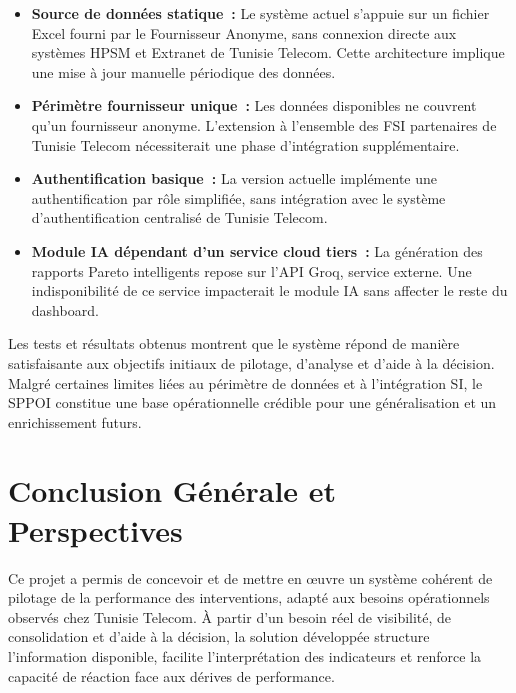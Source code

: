 \documentclass[10pt,a4paper]{report}
\newcommand{\chapconclusion}[1]{%
  \vspace{8pt}%
  \begin{tcolorbox}[conclusionbox]
    #1
  \end{tcolorbox}%
}
\begin{document}
\begin{itemize}[leftmargin=*, itemsep=6pt]
  \item \textbf{Source de données statique~:} Le système actuel s'appuie sur un fichier Excel fourni par le Fournisseur Anonyme, sans connexion directe aux systèmes HPSM et Extranet de Tunisie Telecom. Cette architecture implique une mise à jour manuelle périodique des données.

  \item \textbf{Périmètre fournisseur unique~:} Les données disponibles ne couvrent qu'un fournisseur anonyme. L'extension à l'ensemble des FSI partenaires de Tunisie Telecom nécessiterait une phase d'intégration supplémentaire.

  \item \textbf{Authentification basique~:} La version actuelle implémente une authentification par rôle simplifiée, sans intégration avec le système d'authentification centralisé de Tunisie Telecom.

  \item \textbf{Module IA dépendant d'un service cloud tiers~:} La génération des rapports Pareto intelligents repose sur l'API Groq, service externe. Une indisponibilité de ce service impacterait le module IA sans affecter le reste du dashboard.
\end{itemize}

\chapconclusion{%
Les tests et résultats obtenus montrent que le système répond de manière satisfaisante aux objectifs initiaux de pilotage, d'analyse et d'aide à la décision. Malgré certaines limites liées au périmètre de données et à l'intégration SI, le SPPOI constitue une base opérationnelle crédible pour une généralisation et un enrichissement futurs.%
}

\chapter*{Conclusion Générale et Perspectives}
\thispagestyle{fancy}

Ce projet a permis de concevoir et de mettre en œuvre un système cohérent de pilotage de la performance des interventions, adapté aux besoins opérationnels observés chez Tunisie Telecom. À partir d'un besoin réel de visibilité, de consolidation et d'aide à la décision, la solution développée structure l'information disponible, facilite l'interprétation des indicateurs et renforce la capacité de réaction face aux dérives de performance.
\end{document}
